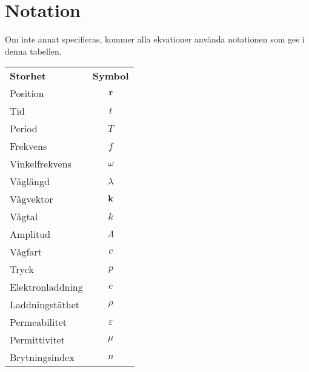 \section{Notation}
Om inte annat specifieras, kommer alla ekvationer använda notationen som ges i denna tabellen.

\begin{table}[!h]
	\centering
	\begin{tabular}{| l | c |}
		\hline
		\textbf{Storhet} & \multicolumn{1}{|l|}{\textbf{Symbol}}\\
		Position         & $\vect{r}$ \\
		\hline
		Tid              & $t$ \\
		\hline
		Period           & $T$ \\
		\hline
		Frekvens         & $f$ \\
		\hline
		Vinkelfrekvens   & $\omega$ \\
		\hline
		Våglängd         & $\lambda$ \\
		\hline
		Vågvektor        & $\vect{k}$ \\
		\hline
		Vågtal           & $k$ \\
		\hline
		Amplitud         & $A$ \\
		\hline
		Vågfart          & $c$ \\
		\hline
		Tryck            & $p$ \\
		\hline
		Elektronladdning & $e$ \\
		\hline
		Laddningstäthet  & $\rho$ \\
		\hline
		Permeabilitet    & $\varepsilon$ \\
		\hline
		Permittivitet    & $\mu$ \\
		\hline
		Brytningsindex   & $n$ \\
		\hline
	\end{tabular}
\end{table}


